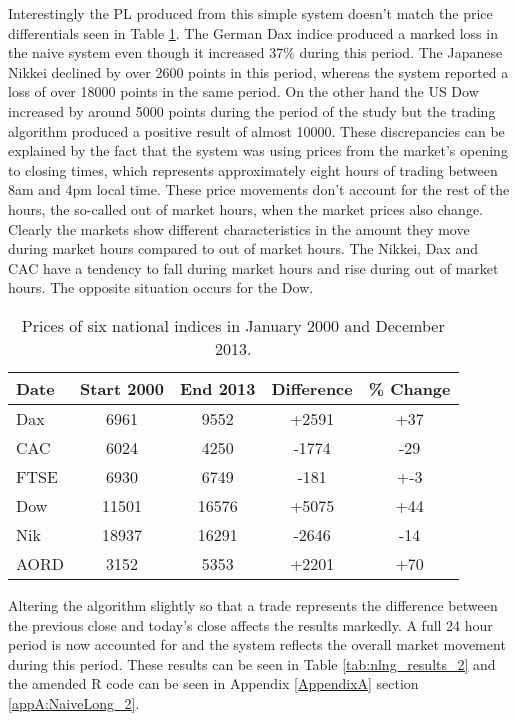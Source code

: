 Interestingly the PL produced from this simple system doesn't match the price differentials seen in Table \ref{tab:ind_start_stop}.  The German Dax indice produced a marked loss in the naive system even though it increased 37\% during this period. The Japanese Nikkei declined by over 2600 points in this period, whereas the system reported a loss of over 18000 points in the same period. On the other hand the US Dow increased by around 5000 points during the period of the study but the trading algorithm produced a positive result of almost 10000. These discrepancies can be explained by the fact that the system was using prices from the market's opening to closing times, which represents approximately  eight hours of trading between 8am and 4pm local time. These price movements don't account for the rest of the hours, the so-called out of market hours, when the market prices also change. Clearly the markets show different characteristics in the amount they move during market hours compared to out of market hours. The Nikkei, Dax and CAC have a tendency to fall during market hours and rise during out of market hours. The opposite situation occurs for the Dow.



\begin{table}[!htbp] \centering  
\caption[Indice Prices 2000 and 2013.]{Prices of six national indices in January 2000 and December 2013.}
\label{tab:ind_start_stop}
\begin{tabular}{lcccc}
\toprule
Date & Start 2000 & End 2013 & Difference & \% Change  \\
\midrule
Dax & 6961 & 9552   & +2591 & +37 \\
CAC & 6024 & 4250   & -1774 & -29 \\
FTSE & 6930 & 6749  & -181  & +-3 \\
Dow & 11501 & 16576 & +5075 & +44 \\
Nik & 18937 & 16291 & -2646 & -14 \\
AORD & 3152 & 5353  & +2201 & +70 \\
\bottomrule
\end{tabular}
\end{table}

Altering the algorithm slightly so that a trade represents the difference between the previous close and today's close affects the results markedly. A full 24 hour period is now accounted for and the system reflects the overall market movement during this period. These results can be seen in Table \ref{tab:nlng_results_2} and the amended R code can be seen in Appendix \ref{AppendixA} section \ref{appA:NaiveLong_2}.

